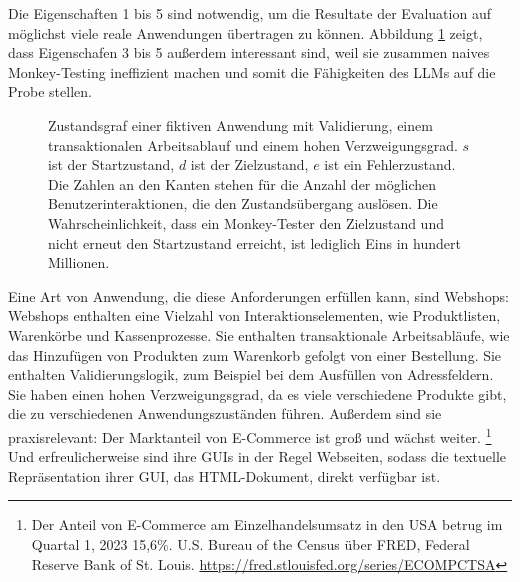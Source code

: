 Die Eigenschaften 1 bis 5 sind notwendig, um die Resultate der Evaluation auf möglichst viele reale Anwendungen übertragen zu können.
Abbildung \ref{fig:sad_monkey} zeigt, dass Eigenschafen 3 bis 5 außerdem interessant sind, weil sie zusammen naives Monkey-Testing ineffizient machen und somit die Fähigkeiten des LLMs auf die Probe stellen.

\begin{figure}
    \centering
    \caption{Zustandsgraf einer fiktiven Anwendung mit Validierung, einem transaktionalen Arbeitsablauf und einem hohen Verzweigungsgrad. $s$ ist der Startzustand, $d$ ist der Zielzustand, $e$ ist ein Fehlerzustand. Die Zahlen an den Kanten stehen für die Anzahl der möglichen Benutzerinteraktionen, die den Zustandsübergang auslösen. Die Wahrscheinlichkeit, dass ein Monkey-Tester den Zielzustand und nicht erneut den Startzustand erreicht, ist lediglich Eins in hundert Millionen.}
    \label{fig:sad_monkey}
\end{figure}

Eine Art von Anwendung, die diese Anforderungen erfüllen kann, sind Webshops:
Webshops enthalten eine Vielzahl von Interaktionselementen, wie Produktlisten, Warenkörbe und Kassenprozesse.
Sie enthalten transaktionale Arbeitsabläufe, wie das Hinzufügen von Produkten zum Warenkorb gefolgt von einer Bestellung.
Sie enthalten Validierungslogik, zum Beispiel bei dem Ausfüllen von Adressfeldern.
Sie haben einen hohen Verzweigungsgrad, da es viele verschiedene Produkte gibt, die zu verschiedenen Anwendungszuständen führen.
Außerdem sind sie praxisrelevant: Der Marktanteil von E-Commerce ist groß und wächst weiter.
\footnote{
Der Anteil von E-Commerce am Einzelhandelsumsatz in den USA betrug im Quartal 1, 2023 15,6\%. U.S. Bureau of the Census über FRED, Federal Reserve Bank of St. Louis. \url{https://fred.stlouisfed.org/series/ECOMPCTSA}}
Und erfreulicherweise sind ihre GUIs in der Regel Webseiten, sodass die textuelle Repräsentation ihrer GUI, das HTML-Dokument, direkt verfügbar ist.

